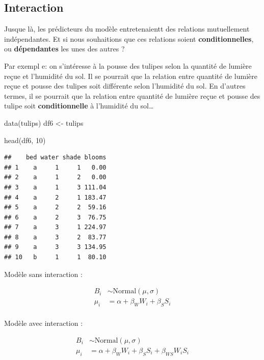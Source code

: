 \documentclass[
  a4paper,11pt,twoside,onecolumn,openright,final,oldfontcommands]{memoir}
\newenvironment{Shaded}{\begin{snugshade}}{\end{snugshade}}
\newcommand{\DecValTok}[1]{\textcolor[rgb]{0.00,0.00,0.81}{#1}}
\newcommand{\FunctionTok}[1]{\textcolor[rgb]{0.00,0.00,0.00}{#1}}
\newcommand{\NormalTok}[1]{#1}
\newcommand{\OtherTok}[1]{\textcolor[rgb]{0.56,0.35,0.01}{#1}}
\theoremstyle{definition}
\theoremstyle{definition}
\theoremstyle{definition}
\theoremstyle{definition}
\theoremstyle{remark}
\begin{document}
\hypertarget{interaction}{%
\subsection{Interaction}\label{interaction}}

Jusque là, les prédicteurs du modèle entretenaientt des relations mutuellement indépendantes. Et si nous souhaitions que ces relations soient \textbf{conditionnelles}, ou \textbf{dépendantes} les unes des autres ?

Par exempl e: on s'intéresse à la pousse des tulipes selon la quantité de lumière reçue et l'humidité du sol. Il se pourrait que la relation entre quantité de lumière reçue et pousse des tulipes soit différente selon l'humidité du sol. En d'autres termes, il se pourrait que la relation entre quantité de lumière reçue et pousse des tulipe soit \textbf{conditionnelle} à l'humidité du sol\ldots{}

\begin{Shaded}
\begin{Highlighting}[]
\FunctionTok{data}\NormalTok{(tulips)}
\NormalTok{df6 }\OtherTok{\textless{}{-}}\NormalTok{ tulips}

\FunctionTok{head}\NormalTok{(df6, }\DecValTok{10}\NormalTok{)}
\end{Highlighting}
\end{Shaded}

\begin{verbatim}
##    bed water shade blooms
## 1    a     1     1   0.00
## 2    a     1     2   0.00
## 3    a     1     3 111.04
## 4    a     2     1 183.47
## 5    a     2     2  59.16
## 6    a     2     3  76.75
## 7    a     3     1 224.97
## 8    a     3     2  83.77
## 9    a     3     3 134.95
## 10   b     1     1  80.10
\end{verbatim}

Modèle sans interaction :

\[
\begin{aligned}
B_{i} &\sim \mathrm{Normal}(\mu, \sigma) \\
\mu_{i} &= \alpha + \beta_{W} W_{i} + \beta_{S} S_{i} \\
\end{aligned}
\]

Modèle avec interaction :

\[
\begin{aligned}
B_{i} &\sim \mathrm{Normal}(\mu, \sigma) \\
\mu_{i} &= \alpha + \beta_{W} W_{i} + \beta_{S} S_{i} + \beta_{WS} W_{i} S_{i}\\
\end{aligned}
\]
\end{document}
